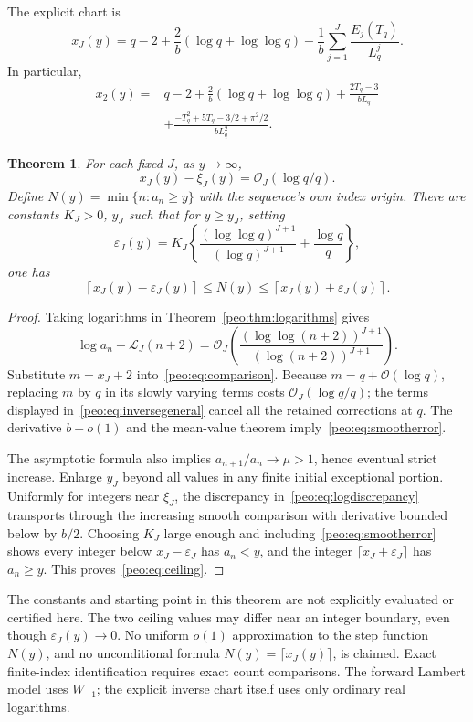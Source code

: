 \documentclass[11pt]{article}
\numberwithin{equation}{section}
\newtheorem{theorem}{Theorem}[section]
\theoremstyle{remark}\newtheorem{remark}[theorem]{Remark}
\newcommand{\Li}{\mathcal L}
\newcommand{\Oh}{\mathcal O}
\begin{document}
The explicit chart is
\begin{equation}
 x_J(y)=q-2+\frac2b(\log q+\log\log q)
 -\frac1b\sum_{j=1}^J\frac{E_j(T_q)}{L_q^j}.
 \label{peo:eq:inversegeneral}
\end{equation}
In particular,
\begin{align}
 x_2(y)={}&q-2+\frac2b(\log q+\log\log q)
 +\frac{2T_q-3}{bL_q}\nonumber\\
 &+\frac{-T_q^2+5T_q-3/2+\pi^2/2}{bL_q^2}.
 \label{peo:eq:inverse2}
\end{align}
\begin{theorem}\label{peo:thm:inverse}
For each fixed $J$, as $y\to\infty$,
\begin{equation}
 x_J(y)-\xi_J(y)=\Oh_J(\log q/q).\label{peo:eq:smootherror}
\end{equation}
Define $N(y)=\min\{n:a_n\ge y\}$ with the sequence's own index origin. There are constants $K_J>0$, $y_J$ such that for $y\ge y_J$, setting
\begin{equation}
 \varepsilon_J(y)=K_J\left\{
 \frac{(\log\log q)^{J+1}}{(\log q)^{J+1}}+\frac{\log q}{q}\right\},
\end{equation}
one has
\begin{equation}
 \left\lceil x_J(y)-\varepsilon_J(y)\right\rceil
 \le N(y)\le
 \left\lceil x_J(y)+\varepsilon_J(y)\right\rceil.
 \label{peo:eq:ceiling}
\end{equation}
\end{theorem}
\begin{proof}
Taking logarithms in Theorem~\ref{peo:thm:logarithms} gives
\begin{equation}
 \log a_n-\Li_J(n+2)
 =\Oh_J\!\left(\frac{(\log\log(n+2))^{J+1}}{(\log(n+2))^{J+1}}\right).
 \label{peo:eq:logdiscrepancy}
\end{equation}
Substitute $m=x_J+2$ into~\eqref{peo:eq:comparison}. Because $m=q+\Oh(\log q)$, replacing $m$ by $q$ in its slowly varying terms costs $\Oh_J(\log q/q)$; the terms displayed in~\eqref{peo:eq:inversegeneral} cancel all the retained corrections at $q$. The derivative $b+o(1)$ and the mean-value theorem imply~\eqref{peo:eq:smootherror}.

The asymptotic formula also implies $a_{n+1}/a_n\to\mu>1$, hence eventual strict increase. Enlarge $y_J$ beyond all values in any finite initial exceptional portion. Uniformly for integers near $\xi_J$, the discrepancy in~\eqref{peo:eq:logdiscrepancy} transports through the increasing smooth comparison with derivative bounded below by $b/2$. Choosing $K_J$ large enough and including~\eqref{peo:eq:smootherror} shows every integer below $x_J-\varepsilon_J$ has $a_n<y$, and the integer $\lceil x_J+\varepsilon_J\rceil$ has $a_n\ge y$. This proves~\eqref{peo:eq:ceiling}.
\end{proof}
The constants and starting point in this theorem are not explicitly evaluated or certified here. The two ceiling values may differ near an integer boundary, even though $\varepsilon_J(y)\to0$. No uniform $o(1)$ approximation to the step function $N(y)$, and no unconditional formula $N(y)=\lceil x_J(y)\rceil$, is claimed. Exact finite-index identification requires exact count comparisons. The forward Lambert model uses $W_{-1}$; the explicit inverse chart itself uses only ordinary real logarithms.
\end{document}
